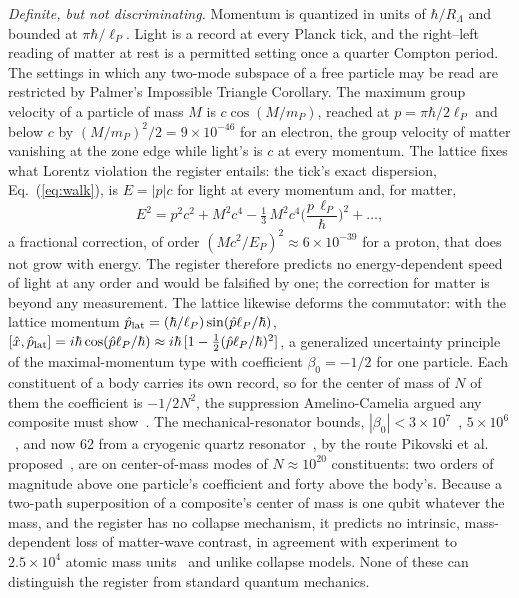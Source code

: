 \documentclass[aps,prd,twocolumn,superscriptaddress,nofootinbib]{revtex4-2}
\begin{document}
\textit{Definite, but not discriminating.} Momentum is quantized in units of $\hbar/R_\Lambda$ and bounded at $\pi\hbar/\ell_P$. Light is a record at every Planck tick, and the right--left reading of matter at rest is a permitted setting once a quarter Compton period. The settings in which any two-mode subspace of a free particle may be read are restricted by Palmer's Impossible Triangle Corollary. The maximum group velocity of a particle of mass $M$ is $c\cos(M/m_P)$, reached at $p = \pi\hbar/2\ell_P$ and below $c$ by $(M/m_P)^2/2 = 9\times10^{-46}$ for an electron, the group velocity of matter vanishing at the zone edge while light's is $c$ at every momentum. The lattice fixes what Lorentz violation the register entails: the tick's exact dispersion, Eq.~(\ref{eq:walk}), is $E = |p|c$ for light at every momentum and, for matter,
\begin{equation}
E^2 = p^2c^2 + M^2c^4 - \tfrac{1}{3}\,M^2c^4\Big(\frac{p\,\ell_P}{\hbar}\Big)^2 + \dots ,
\label{eq:lattice}
\end{equation}
a fractional correction, of order $(Mc^2/E_P)^2 \approx 6\times10^{-39}$ for a proton, that does not grow with energy. The register therefore predicts no energy-dependent speed of light at any order and would be falsified by one; the correction for matter is beyond any measurement. The lattice likewise deforms the commutator: with the lattice momentum $\hat p_{\rm lat} = (\hbar/\ell_P)\sin(\hat p\ell_P/\hbar)$, $[\hat x,\hat p_{\rm lat}] = i\hbar\cos(\hat p\ell_P/\hbar) \approx i\hbar\,[1 - \tfrac12(\hat p\ell_P/\hbar)^2]$, a generalized uncertainty principle of the maximal-momentum type with coefficient $\beta_0 = -1/2$ for one particle. Each constituent of a body carries its own record, so for the center of mass of $N$ of them the coefficient is $-1/2N^2$, the suppression Amelino-Camelia argued any composite must show~\cite{amelino2013}. The mechanical-resonator bounds, $|\beta_0| < 3\times10^7$~\cite{bawaj2015}, $5\times10^6$~\cite{bushev2019}, and now 62 from a cryogenic quartz resonator~\cite{campbell2023}, by the route Pikovski et al. proposed~\cite{pikovski2012}, are on center-of-mass modes of $N \approx 10^{20}$ constituents: two orders of magnitude above one particle's coefficient and forty above the body's. Because a two-path superposition of a composite's center of mass is one qubit whatever the mass, and the register has no collapse mechanism, it predicts no intrinsic, mass-dependent loss of matter-wave contrast, in agreement with experiment to $2.5\times10^4$ atomic mass units~\cite{fein2019} and unlike collapse models. None of these can distinguish the register from standard quantum mechanics.
\end{document}
